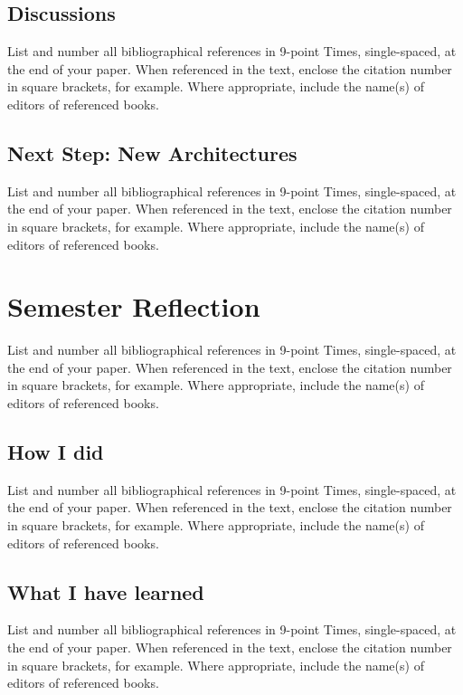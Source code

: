 \documentclass[10pt,twocolumn,letterpaper]{article}
\begin{document}
\subsection{Discussions}

List and number all bibliographical references in 9-point Times,
single-spaced, at the end of your paper. When referenced in the text,
enclose the citation number in square brackets, for
example.  Where appropriate, include the name(s) of
editors of referenced books.


\subsection{Next Step: New Architectures}

List and number all bibliographical references in 9-point Times,
single-spaced, at the end of your paper. When referenced in the text,
enclose the citation number in square brackets, for
example.  Where appropriate, include the name(s) of
editors of referenced books.

\section{Semester Reflection}
List and number all bibliographical references in 9-point Times,
single-spaced, at the end of your paper. When referenced in the text,
enclose the citation number in square brackets, for
example.  Where appropriate, include the name(s) of
editors of referenced books.

\subsection{How I did}

List and number all bibliographical references in 9-point Times,
single-spaced, at the end of your paper. When referenced in the text,
enclose the citation number in square brackets, for
example.  Where appropriate, include the name(s) of
editors of referenced books.

\subsection{What I have learned}

List and number all bibliographical references in 9-point Times,
single-spaced, at the end of your paper. When referenced in the text,
enclose the citation number in square brackets, for
example.  Where appropriate, include the name(s) of
editors of referenced books.
\end{document}
